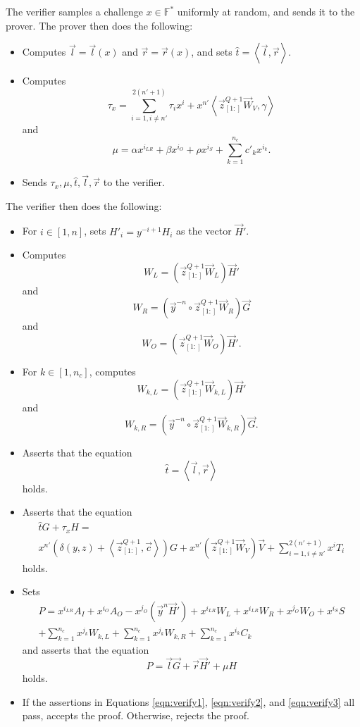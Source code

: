 \documentclass{article}
\newcommand{\FF}{\mathbb{F}}
\newcommand{\mat}[1]{\vec{#1}}
\newcommand{\zq}{\vec{z}^{Q+1}_{[1:]}}
\begin{document}
The verifier samples a challenge $x \in \FF^*$ uniformly at random, and sends it to the prover.
The prover then does the following:
\begin{itemize}
	\item Computes $\vec{l} = \vec{l}(x)$ and $\vec{r} = \vec{r}(x)$, and sets $\widehat{t} = \left\langle \vec{l}, \vec{r} \right\rangle$.
	\item Computes
	$$\tau_x = \sum_{i=1, i \neq n'}^{2(n' + 1)} \tau_i x^i + x^{n'} \left\langle \zq \mat{W}_V, \gamma \right\rangle$$
	and
	$$\mu = \alpha x^{i_{LR}} + \beta x^{i_O} + \rho x^{i_S} + \sum_{k=1}^{n_c} c'_k x^{i_k}.$$
	\item Sends $\tau_x, \mu, \widehat{t}, \vec{l}, \vec{r}$ to the verifier.
\end{itemize}
The verifier then does the following:
\begin{itemize}
	\item For $i \in [1, n]$, sets $H'_i = y^{-i + 1} H_i$ as the vector $\vec{H}'$.
	\item Computes
	$$W_L = \left( \zq \mat{W}_L \right) \vec{H}'$$
	and
	$$W_R = \left( \vec{y}^{-n} \circ \zq \mat{W}_R \right) \vec{G}$$
	and
	$$W_O = \left( \zq \mat{W}_O \right) \vec{H}'.$$
	\item For $k \in [1, n_c]$, computes
	$$W_{k,L} = \left( \zq \mat{W}_{k,L} \right) \vec{H}'$$
	and
	$$W_{k,R} = \left( \vec{y}^{-n} \circ \zq \mat{W}_{k,R} \right) \vec{G}.$$
	\item Asserts that the equation
	\begin{equation}
		\label{eqn:verify1}
		\widehat{t} = \left\langle \vec{l}, \vec{r} \right\rangle
	\end{equation}
	holds.
	\item Asserts that the equation
	\begin{multline}
		\label{eqn:verify2}
		\widehat{t} G + \tau_x H = \\
		x^{n'}\left( \delta(y, z) + \left\langle \zq, \vec{c} \right\rangle \right)G + x^{n'}\left( \zq \vec{W}_V \right) \vec{V} + \sum_{i=1, i \neq n'}^{2(n' + 1)} x^i T_i
	\end{multline}
	holds.
	\item Sets
	\begin{multline*}
		P = x^{i_{LR}} A_I + x^{i_O} A_O - x^{j_O} \left( \vec{y}^n \vec{H}' \right) + x^{i_{LR}} W_L + x^{i_{LR}} W_R + x^{j_O} W_O + x^{i_S} S \\
		+ \sum_{k=1}^{n_c} x^{j_k} W_{k,L} + \sum_{k=1}^{n_c} x^{j_k} W_{k,R} + \sum_{k=1}^{n_c} x^{i_k} C_k
	\end{multline*}
	and asserts that the equation
	\begin{equation}
		\label{eqn:verify3}
		P = \vec{l} \vec{G} + \vec{r} \vec{H}' + \mu H
	\end{equation}
	holds.
	\item If the assertions in Equations \ref{eqn:verify1}, \ref{eqn:verify2}, and \ref{eqn:verify3} all pass, accepts the proof.
	Otherwise, rejects the proof.
\end{itemize}
\end{document}
